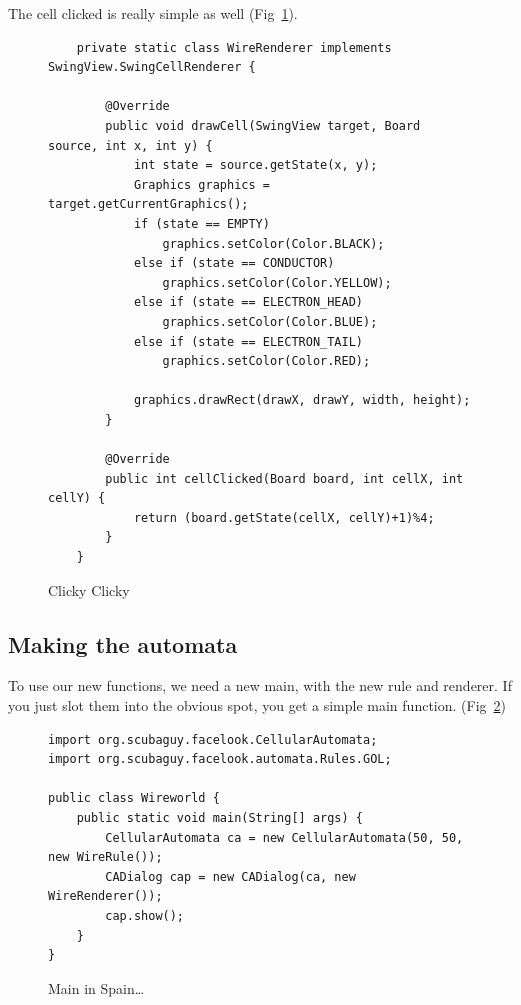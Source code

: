 \documentclass{report}
\begin{document}
The cell clicked is really simple as well (Fig~\ref{code:click}).
\begin{figure}[H]
\begin{lstlisting}
	private static class WireRenderer implements SwingView.SwingCellRenderer {

        @Override
        public void drawCell(SwingView target, Board source, int x, int y) {
            int state = source.getState(x, y);
            Graphics graphics = target.getCurrentGraphics();
            if (state == EMPTY)
                graphics.setColor(Color.BLACK);
            else if (state == CONDUCTOR)
                graphics.setColor(Color.YELLOW);
            else if (state == ELECTRON_HEAD)
                graphics.setColor(Color.BLUE);
            else if (state == ELECTRON_TAIL)
                graphics.setColor(Color.RED);
            
            graphics.drawRect(drawX, drawY, width, height);
        }

        @Override
        public int cellClicked(Board board, int cellX, int cellY) {
            return (board.getState(cellX, cellY)+1)%4;
        }
    }
    \end{lstlisting}
\caption{Clicky Clicky}
\label{code:click}
\end{figure}

\subsection{Making the automata}
To use our new functions, we need a new main, with the new rule and renderer. If
you just slot them into the obvious spot, you get a simple main function.
(Fig~\ref{code:main}) \begin{figure}[H]
\begin{lstlisting}
import org.scubaguy.facelook.CellularAutomata;
import org.scubaguy.facelook.automata.Rules.GOL;

public class Wireworld {
    public static void main(String[] args) {
        CellularAutomata ca = new CellularAutomata(50, 50, new WireRule());
        CADialog cap = new CADialog(ca, new WireRenderer());
        cap.show();
    }
}
\end{lstlisting}
\caption{Main in Spain\ldots}
\label{code:main}
\end{figure}
\end{document}
